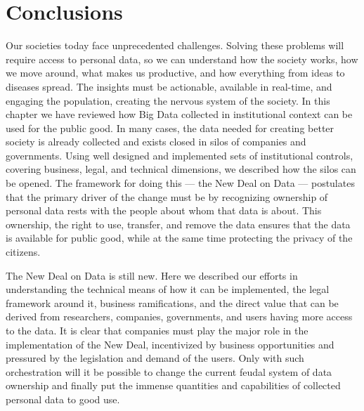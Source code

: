 \section{Conclusions}

Our societies today face unprecedented challenges.
Solving these problems will require access to personal data, so we can understand how the society works, how we move around, what makes us productive, and how everything from ideas to diseases spread.  
The insights must be actionable, available in real-time, and engaging the population, creating the nervous system of the society.
In this chapter we have reviewed how Big Data collected in institutional context can be used for the public good.
In many cases, the data needed for creating better society is already collected and exists closed in silos of companies and governments.
Using well designed and implemented sets of institutional controls, covering business, legal, and technical dimensions, we described how the silos can be opened.
The framework for doing this --- the New Deal on Data --- postulates that the primary driver of the change must be by recognizing  ownership of personal data rests with the people about whom that data is about.
This ownership, the right to use, transfer, and remove the data ensures that the data is available for public good, while at the same time protecting the privacy of the citizens.

The New Deal on Data is still new.
Here we described our efforts in understanding the technical means of how it can be implemented, the legal framework around it, business ramifications, and the direct value that can be derived from researchers, companies, governments, and users having more access to the data.
It is clear that companies must play the major role in the implementation of the New Deal, incentivized by business opportunities and pressured by the legislation and demand of the users.
Only with such orchestration will it be possible to change the current feudal system of data ownership and finally put the immense quantities and capabilities of collected personal data to good use. 
